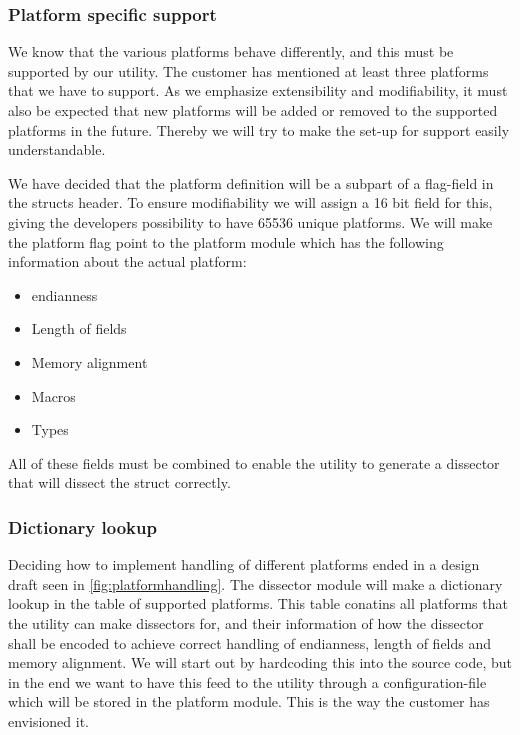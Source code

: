 \subsubsection{Platform specific support}
We know that the various platforms behave differently, and this must be supported by our \gls{utility}. The customer has mentioned at least three platforms that we have to support. As we emphasize extensibility and modifiability, it must also be expected that new platforms will be added or removed to the supported platforms in the future. Thereby we will try to make the set-up for support easily understandable.

We have decided that the platform definition will be a subpart of a flag-field in the \glspl{struct} \gls{header}. To ensure modifiability we will assign a 16 bit field for this, giving the developers possibility to have 65536 unique platforms. We will make the platform flag point to the platform module which has the following information about the actual platform:
\begin{itemize}
\item \Gls{endianness}
\item Length of fields
\item Memory alignment
\item Macros
\item Types
\end{itemize}
All of these fields must be combined to enable the \gls{utility} to generate a \gls{dissector} that will dissect the \gls{struct} correctly.\\

\subsubsection{Dictionary lookup}
Deciding how to implement handling of different platforms ended in a design draft seen in \autoref{fig:platformhandling}. The \gls{dissector} module will make a dictionary lookup in the table of supported platforms. This table conatins all platforms that the \gls{utility} can make \glspl{dissector} for, and their information of how the \gls{dissector} shall be encoded to achieve correct handling of \gls{endianness}, length of fields and memory alignment.
We will start out by hardcoding this into the source code, but in the end we want to have this feed to the \gls{utility} through a configuration-file which will be stored in the platform module. This is the way the customer has envisioned it.  

